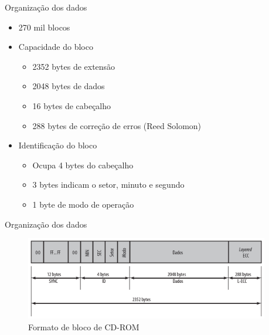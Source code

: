 \documentclass[aspectratio=169,
				xcolor=table]{beamer}
\begin{document}
	\begin{frame}{Organização dos dados}
		\begin{itemize}
			\item 270 mil blocos
			\vspace{1em}
			\item Capacidade do bloco
			\begin{itemize}
				\item 2352 bytes de extensão
				\item 2048 bytes de dados
				\item 16 bytes de cabeçalho
				\item 288 bytes de correção de erros (Reed Solomon)
			\end{itemize}
			\vspace{1em}
			\item Identificação do bloco
			\begin{itemize}
				\item Ocupa 4 bytes do cabeçalho
				\item 3 bytes indicam o setor, minuto e segundo
				\item 1 byte de modo de operação
			\end{itemize}
		\end{itemize}
	\end{frame}
	
	\begin{frame}{Organização dos dados}
		\begin{figure}[hbtp]
		\centering
		\includegraphics[width=0.95\textwidth, keepaspectratio]{../figs/cap08/organizacaoCD}
		\caption{Formato de bloco de CD-ROM }
		\end{figure}		
	\end{frame}
\end{document}
